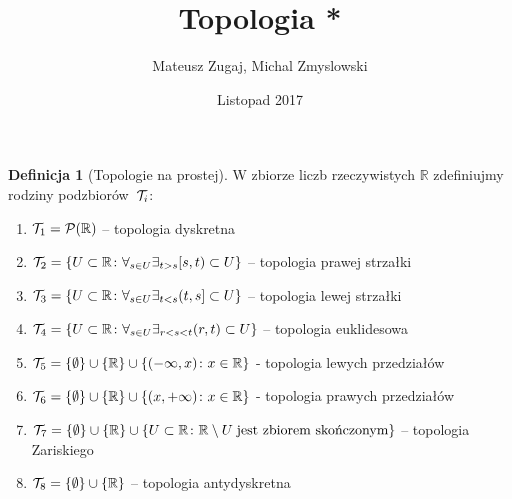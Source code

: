 \documentclass{article}
\title{Topologia *}
\author{Mateusz Zugaj, Michal Zmyslowski}
\date{Listopad 2017}w
\theoremstyle{definition}%
\newtheorem{defn}{Definicja}
\theoremstyle{theorem}
\newcommand{\R}{\mathbb{R}} %
\newcommand{\Pow}{\mathcal{P}} %
\begin{document}
	
	\maketitle
	\begin{defn}[Topologie na prostej] W zbiorze liczb rzeczywistych  $\R$ zdefiniujmy rodziny podzbiorów~${\cal T}_i$:
		\begin{enumerate}
			\item ${\cal T}_1=\Pow (\R)$ -- topologia dyskretna
			\item ${\cal T}_2=\{U\subset \R\colon  \forall_{s\in U}\exists_{t>s}[s,t)\subset U\}$ -- topologia prawej strzałki
			\item ${\cal T}_3=\{U\subset \R\colon  \forall_{s\in U}\exists_{t<s}(t,s]\subset U\}$ -- topologia lewej strzałki
			\item ${\cal T}_4=\{U\subset \R\colon  \forall_{s\in U}\exists_{r<s<t}(r,t)\subset U\}$  -- topologia euklidesowa
			\item ${\cal T}_5=\{\emptyset\}\cup\{\R\}\cup\{(-\infty,x)\colon x\in \R\}$ - topologia lewych przedziałów
			\item ${\cal T}_6=\{\emptyset\}\cup\{\R\}\cup\{(x,+\infty)\colon x\in \R\}$ - topologia prawych przedziałów
			\item ${\cal T}_7=\{\emptyset\}\cup\{\R\}\cup\{U\subset \R\colon  \R\setminus U \; \hbox{jest zbiorem skończonym}\}$ -- topologia Zariskiego
			\item ${\cal T}_8=\{\emptyset\}\cup\{\R\}$ -- topologia antydyskretna
		\end{enumerate}
	\end{defn}
	
\end{document}
